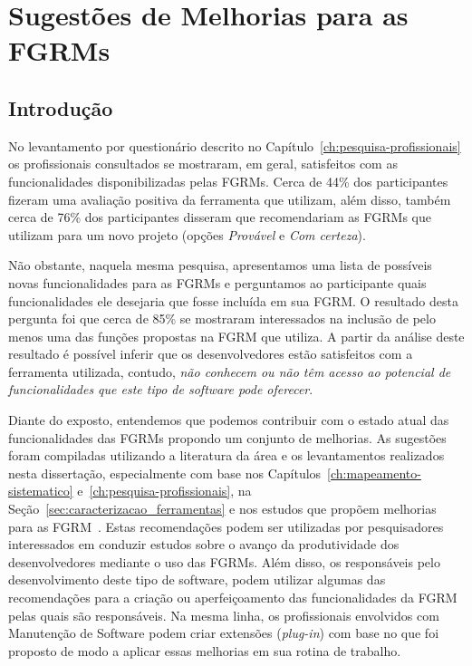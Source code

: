 \chapter{Sugestões de Melhorias para as FGRMs}\label{ch:sug_melhoria}

\section{Introdução}\label{sec:sug_melhoria_intro}

No levantamento por questionário descrito no
Capítulo~\ref{ch:pesquisa-profissionais} os profissionais consultados se
mostraram, em geral, satisfeitos com as funcionalidades disponibilizadas pelas
FGRMs. Cerca de 44\% dos par\-ti\-ci\-pan\-tes fizeram uma avaliação positiva
da ferramenta que utilizam, além disso, também cerca de 76\% dos participantes
disseram que recomendariam as FGRMs que utilizam para um novo projeto (opções
\textit{Provável} e \textit{Com certeza}).

Não obstante, naquela mesma pesquisa, apresentamos uma lista de possíveis novas
funcionalidades para as FGRMs e perguntamos ao participante quais
funcionalidades ele desejaria que fosse incluída  em sua FGRM\@. O resultado
desta pergunta foi que cerca de 85\% se mostraram interessados na inclusão de
pelo menos uma das funções propostas na FGRM que utiliza. A partir da análise
deste resultado é possível inferir que os desenvolvedores estão satisfeitos com
a ferramenta utilizada, contudo, \textit{não conhecem ou não têm acesso ao
    potencial de funcionalidades que este tipo de software pode oferecer}.

Diante do exposto, entendemos que podemos contribuir com o estado a\-tu\-al das
funcionalidades das FGRMs propondo um conjunto de melhorias. As sugestões foram
compiladas utilizando a literatura da área e os levantamentos realizados nesta
dissertação, especialmente com base nos
Capítulos~\ref{ch:mapeamento-sistematico} e~\ref{ch:pesquisa-profissionais}, na
Seção~\ref{sec:caracterizacao_ferramentas} e nos estudos que propõem melhorias
para as FGRM~\cite{zimmermann2009improving, zimmermann2010makes, singh2011bug}.
Estas recomendações podem ser utilizadas por pesquisadores interessados em
conduzir estudos sobre o avanço da produtividade dos desenvolvedores mediante o
uso das FGRMs. Além disso, os responsáveis pelo desenvolvimento deste tipo de
software, podem utilizar algumas das recomendações para a criação ou
aperfeiçoamento das funcionalidades da FGRM pelas quais são responsáveis. Na
mesma linha, os profissionais envolvidos com Manutenção de Software podem criar
extensões (\textit{plug-in}) com base no que foi proposto de modo a aplicar
essas melhorias em sua rotina de trabalho.

